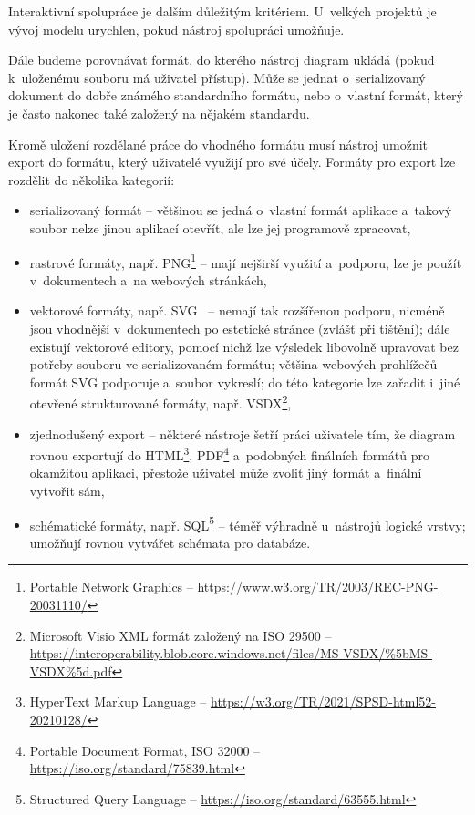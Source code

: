 Interaktivní spolupráce je dalším důležitým kritériem. U~velkých projektů je
vývoj modelu urychlen, pokud nástroj spolupráci umožňuje.

Dále budeme porovnávat formát, do kterého nástroj diagram ukládá (pokud
k~uloženému souboru má uživatel přístup). Může se jednat o~serializovaný dokument
do dobře známého standardního formátu, nebo o~vlastní formát, který je často
nakonec také založený na nějakém standardu.

Kromě uložení rozdělané práce do vhodného formátu musí nástroj umožnit export do
formátu, který uživatelé využijí pro své účely. Formáty pro export lze rozdělit
do několika kategorií:
\begin{itemize}
  \item serializovaný formát -- většinou se jedná o~vlastní formát aplikace
a~takový soubor nelze jinou aplikací otevřít, ale lze jej programově zpracovat,
  \item rastrové formáty, např. PNG\footnote{Portable Network Graphics --
  \url{https://www.w3.org/TR/2003/REC-PNG-20031110/}} -- mají nejširší využití
  a~podporu, lze je použít v~dokumentech a~na webových stránkách,
  \item vektorové formáty, např. SVG~\cite{Dirk18} -- nemají tak rozšířenou
  podporu, nicméně jsou vhodnější v~dokumentech po estetické stránce (zvlášť při
  tištění); dále existují vektorové editory, pomocí nichž lze výsledek libovolně
  upravovat bez potřeby souboru ve serializovaném formátu; většina webových
  prohlížečů formát SVG podporuje a~soubor vykreslí; do této kategorie lze
  zařadit i~jiné otevřené strukturované formáty, např. VSDX\footnote{Microsoft
  Visio XML formát založený na ISO 29500 --
  \url{https://interoperability.blob.core.windows.net/files/MS-VSDX/\%5bMS-VSDX\%5d.pdf}},
  \item zjednodušený export -- některé nástroje šetří práci uživatele tím, že
  diagram rovnou exportují do HTML\footnote{HyperText Markup Language --
  \url{https://w3.org/TR/2021/SPSD-html52-20210128/}}, PDF\footnote{Portable
  Document Format, ISO 32000 -- \url{https://iso.org/standard/75839.html}}
  a~podobných finálních formátů pro okamžitou aplikaci, přestože uživatel může
  zvolit jiný formát a~finální vytvořit sám,
  \item schématické formáty, např. SQL\footnote{Structured Query Language --
  \url{https://iso.org/standard/63555.html}} -- téměř výhradně u~nástrojů
  lo\-gic\-ké vrst\-vy; umožňují rovnou vytvářet schémata pro databáze.
\end{itemize}

